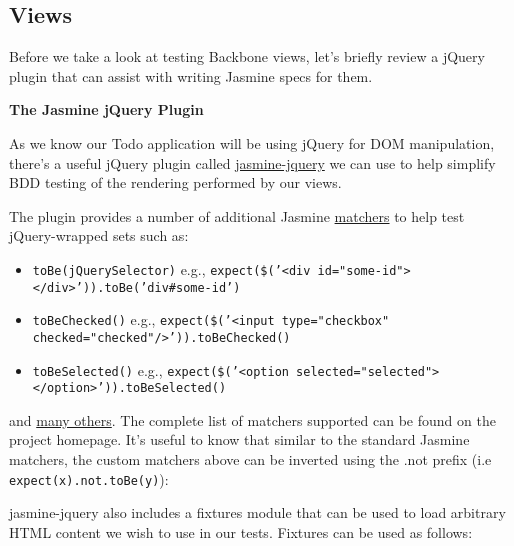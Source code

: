 \documentclass[9pt]{book}
\newenvironment{Shaded}{}{}
\newcommand{\StringTok}[1]{\textcolor[rgb]{0.25,0.44,0.63}{{#1}}}
\newcommand{\OtherTok}[1]{\textcolor[rgb]{0.00,0.44,0.13}{{#1}}}
\newcommand{\FunctionTok}[1]{\textcolor[rgb]{0.02,0.16,0.49}{{#1}}}
\newcommand{\NormalTok}[1]{{#1}}
\begin{document}
\subsection{Views}\label{views-2}

Before we take a look at testing Backbone views, let's briefly review a
jQuery plugin that can assist with writing Jasmine specs for them.

\textbf{The Jasmine jQuery Plugin}

As we know our Todo application will be using jQuery for DOM
manipulation, there's a useful jQuery plugin called
\href{https://github.com/velesin/jasmine-jquery}{jasmine-jquery} we can
use to help simplify BDD testing of the rendering performed by our
views.

The plugin provides a number of additional Jasmine
\href{https://github.com/pivotal/jasmine/wiki/Matchers}{matchers} to
help test jQuery-wrapped sets such as:

\begin{itemize}
\itemsep1pt\parskip0pt
\item
  \texttt{toBe(jQuerySelector)} e.g.,
  \texttt{expect(\$('\textless{}div id="some-id"\textgreater{}\textless{}/div\textgreater{}')).toBe('div\#some-id')}
\item
  \texttt{toBeChecked()} e.g.,
  \texttt{expect(\$('\textless{}input type="checkbox" checked="checked"/\textgreater{}')).toBeChecked()}
\item
  \texttt{toBeSelected()} e.g.,
  \texttt{expect(\$('\textless{}option selected="selected"\textgreater{}\textless{}/option\textgreater{}')).toBeSelected()}
\end{itemize}

and \href{https://github.com/velesin/jasmine-jquery}{many others}. The
complete list of matchers supported can be found on the project
homepage. It's useful to know that similar to the standard Jasmine
matchers, the custom matchers above can be inverted using the .not
prefix (i.e \texttt{expect(x).not.toBe(y)}):

\begin{Shaded}
\end{Shaded}

jasmine-jquery also includes a fixtures module that can be used to load
arbitrary HTML content we wish to use in our tests. Fixtures can be used
as follows:
\end{document}

